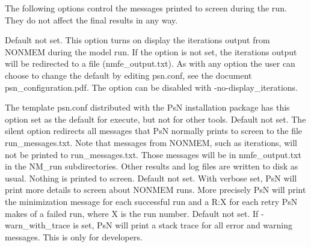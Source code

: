 The following options control the messages printed to screen during the run. They do not affect the final results in any way.
\begin{optionlist}
Default not set.  This option turns on display the iterations output from NONMEM during the model run. If the option is not set, the iterations output will be redirected to a file (nmfe\_output.txt). As with any option the user can choose to change the default by editing psn.conf, see the document psn\_configuration.pdf. The option can be disabled with -no-display\_iterations.

The template psn.conf distributed with the PsN installation package has this option set as the default for execute, but not for other tools.  
\nextopt
{}
Default not set. The silent option redirects all messages that PsN normally prints to screen to the file run\_messages.txt. Note that messages from NONMEM, such as iterations, will not be printed to run\_messages.txt. Those messages will be in nmfe\_output.txt in the NM\_run subdirectories. Other results and log files are written to disk as usual. Nothing is printed to screen. 
\nextopt
{}
Default not set. With verbose set, PsN will print more details to screen about NONMEM runs. More precisely PsN will print the minimization message for each successful run and a R:X for each retry PsN makes of a failed run, where X is the run number. 
\nextopt
{}
Default not set. If -warn\_with\_trace is set, PsN will print a stack trace for all error and warning messages. This is only for developers. 
\nextopt
\end{optionlist}
